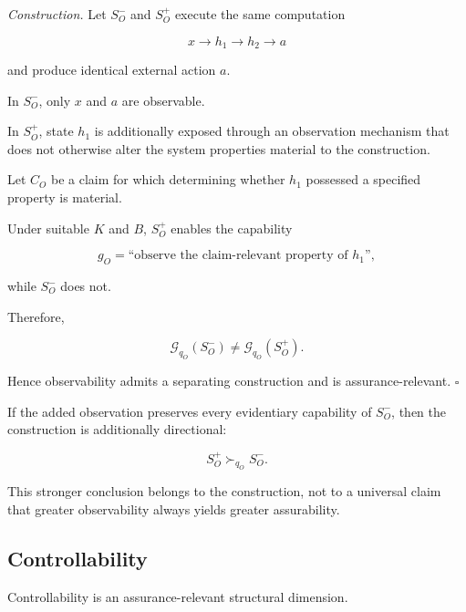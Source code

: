\textit{Construction.}
Let \(S_O^{-}\) and \(S_O^{+}\) execute the same computation

\begin{equation}
  x
  \rightarrow
  h_1
  \rightarrow
  h_2
  \rightarrow
  a
\end{equation}

and produce identical external action \(a\).

In \(S_O^{-}\), only \(x\) and \(a\) are observable.

In \(S_O^{+}\), state \(h_1\) is additionally exposed through an observation mechanism that does not otherwise alter the system properties material to the construction.

Let \(C_O\) be a claim for which determining whether \(h_1\) possessed a specified property is material.

Under suitable \(K\) and \(B\), \(S_O^{+}\) enables the capability

\begin{equation}
  g_O
  =
  \text{``observe the claim-relevant property of }h_1\text{''},
\end{equation}

while \(S_O^{-}\) does not.

Therefore,

\begin{equation}
  \mathcal{G}_{q_O}(S_O^{-})
  \neq
  \mathcal{G}_{q_O}(S_O^{+}).
\end{equation}

Hence observability admits a separating construction and is assurance-relevant.
\hfill\(\square\)

If the added observation preserves every evidentiary capability of \(S_O^{-}\), then the construction is additionally directional:

\begin{equation}
  S_O^{+}
  \succ_{q_O}
  S_O^{-}.
\end{equation}

This stronger conclusion belongs to the construction, not to a universal claim that greater observability always yields greater assurability.

\subsection{Controllability}
\label{aa.subsec.controllability-contribution}

\begin{proposition}
  \label{se320.prop.ControllabilityContribution}
  Controllability is an assurance-relevant structural dimension.
\end{proposition}

